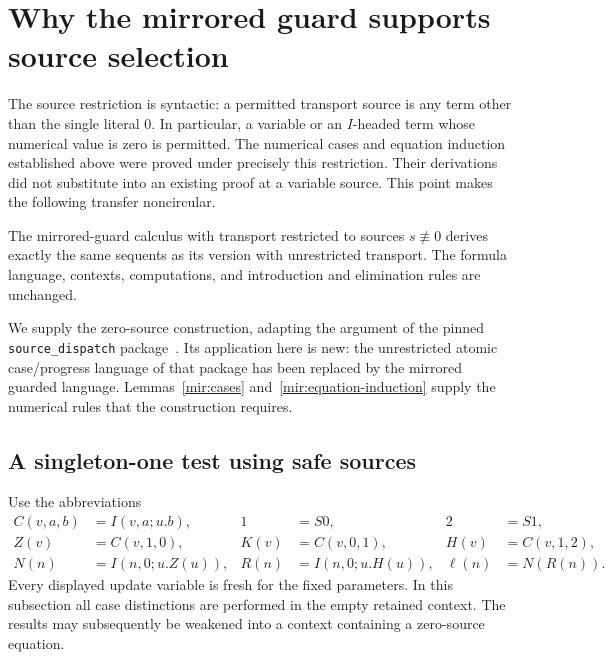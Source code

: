 
\section{Why the mirrored guard supports source selection}
\label{compat:source-compatibility}

The source restriction is syntactic: a permitted transport source is any
term other than the single literal $0$. In particular, a variable or an
$I$-headed term whose numerical value is zero is permitted. The numerical
cases and equation induction established above were proved under precisely
this restriction. Their derivations did not substitute into an existing
proof at a variable source. This point makes the following transfer
noncircular.

\begin{theorem}
\label{compat:zero-restored}
The mirrored-guard calculus with transport restricted to sources
$s\not\equiv0$ derives exactly the same sequents as its version with
unrestricted transport. The formula language, contexts, computations,
and introduction and elimination rules are unchanged.
\end{theorem}

We supply the zero-source construction, adapting the argument of the
pinned \texttt{source\_dispatch} package~\cite{dispatch}. Its application here is new:
the unrestricted atomic case/progress language of that package has been
replaced by the mirrored guarded language. Lemmas~\ref{mir:cases}
and~\ref{mir:equation-induction} supply the numerical rules that the
construction requires.

\subsection{A singleton-one test using safe sources}

Use the abbreviations
\[
\begin{aligned}
 C(v,a,b)&=I(v,a;u.b),& 1&=S0,&2&=S1,\\
 Z(v)&=C(v,1,0),& K(v)&=C(v,0,1),& H(v)&=C(v,1,2),\\
 N(n)&=I(n,0;u.Z(u)),&
 R(n)&=I(n,0;u.H(u)),& \ell(n)&=N(R(n)).
\end{aligned}
\]
Every displayed update variable is fresh for the fixed parameters.
In this subsection all case distinctions are performed in the empty
retained context. The results may subsequently be weakened into a context
containing a zero-source equation.

